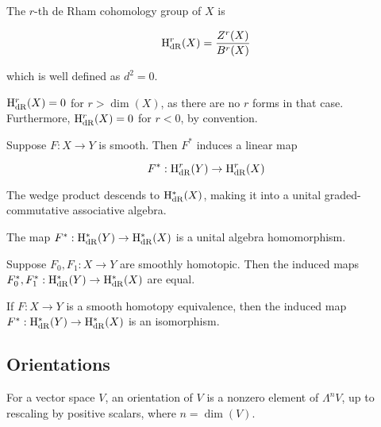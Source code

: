 \begin{definition}
     The \(r\)-th de Rham cohomology group of \(X\) is

    \[\mathrm{H}_\mathrm{dR}^r(X) = \frac{Z^r(X)}{B^r(X)}\]

    which is well defined as \(d^2 = 0\).
\end{definition}

\begin{remark}
    \(\mathrm{H}_\mathrm{dR}^r(X) = 0\) for \(r > \dim(X)\), as there are no \(r\) forms in that case. Furthermore, \(\mathrm{H}_\mathrm{dR}^r(X) = 0\) for \(r < 0\), by convention.
\end{remark}

\begin{proposition}
    [functoriality] Suppose \(F : X \to Y\) is smooth. Then \(F^*\) induces a linear map

    \[F^* : \mathrm{H}_\mathrm{dR}^r(Y) \to \mathrm{H}_\mathrm{dR}^r(X)\]
\end{proposition}

\begin{proposition}
    The wedge product descends to \(\mathrm{H}_\mathrm{dR}^*(X)\), making it into a unital graded-commutative associative algebra.
\end{proposition}

\begin{corollary}
    The map \(F^* : \mathrm{H}_\mathrm{dR}^*(Y) \to \mathrm{H}_\mathrm{dR}^*(X)\) is a unital algebra homomorphism.
\end{corollary}

\begin{proposition}

    Suppose \(F_0, F_1 : X \to Y\) are smoothly homotopic. Then the induced maps \(F_0^*, F_1^* : \mathrm{H}_\mathrm{dR}^*(Y) \to \mathrm{H}_\mathrm{dR}^*(X)\) are equal.
\end{proposition}

\begin{corollary}
    If \(F : X \to Y\) is a smooth homotopy equivalence, then the induced map \(F^* : \mathrm{H}_\mathrm{dR}^*(Y) \to \mathrm{H}_\mathrm{dR}^*(X)\) is an isomorphism.
\end{corollary}

\subsection{Orientations}

\begin{definition}
     For a vector space \(V\), an orientation of \(V\) is a nonzero element of \(\Lambda^nV\), up to rescaling by positive scalars, where \(n = \dim(V)\).
\end{definition}

